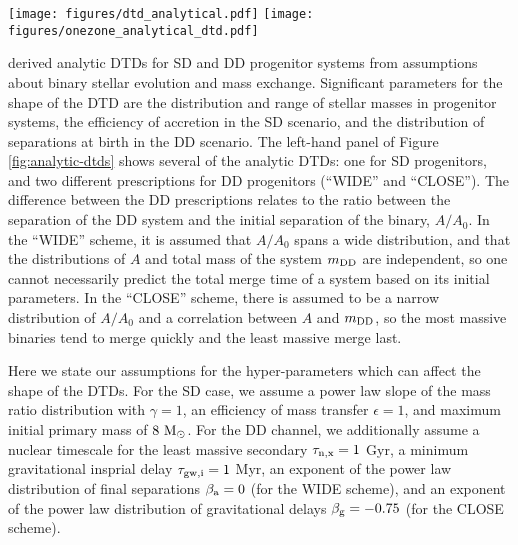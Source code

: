 \documentclass[twocolumn,twocolappendix]{aastex631}
\begin{document}
\begin{figure*}
    \centering
    \texttt{[image: figures/dtd\_analytical.pdf]}
    \texttt{[image: figures/onezone\_analytical\_dtd.pdf]}
    \caption{\textit{Left:} Analytic DTDs from \citet[][solid curves]{Greggio2005-AnalyticalRates} and simplified approximations thereof (dashed curves; see Section \ref{sec:dtd-models}). Some functions are presented with a constant multiplicative factor for visual clarity. \textit{Right:} Abundance tracks and distributions from one-zone models with the analytic and simple DTDs (same color scheme). For visual clarity, we vary the mass-loading factor to be $\eta=4$, $\eta=2$, and $\eta=1$ for the red, green, and blue curves, respectively. All other model parameters are identical.}
    \label{fig:analytic-dtds}
\end{figure*}

\citet{Greggio2005-AnalyticalRates} derived analytic DTDs for SD and DD progenitor systems from assumptions about binary stellar evolution and mass exchange. Significant parameters for the shape of the DTD are the distribution and range of stellar masses in progenitor systems, the efficiency of accretion in the SD scenario, and the distribution of separations at birth in the DD scenario. The left-hand panel of Figure \ref{fig:analytic-dtds} shows several of the \citet{Greggio2005-AnalyticalRates} analytic DTDs: one for SD progenitors, and two different prescriptions for DD progenitors (``WIDE'' and ``CLOSE''). The difference between the DD prescriptions relates to the ratio between the separation of the DD system and the initial separation of the binary, $A/A_0$. In the ``WIDE'' scheme, it is assumed that $A/A_0$ spans a wide distribution, and that the distributions of $A$ and total mass of the system $m_{\rm DD}$ are independent, so one cannot necessarily predict the total merge time of a system based on its initial parameters. In the ``CLOSE'' scheme, there is assumed to be a narrow distribution of $A/A_0$ and a correlation between $A$ and $m_{\rm DD}$, so the most massive binaries tend to merge quickly and the least massive merge last.

Here we state our assumptions for the hyper-parameters which can affect the shape of the \citet{Greggio2005-AnalyticalRates} DTDs. For the SD case, we assume a power law slope of the mass ratio distribution with $\gamma=1$, an efficiency of mass transfer $\epsilon=1$, and maximum initial primary mass of $8~{\rm M}_\odot$. For the DD channel, we additionally assume a nuclear timescale for the least massive secondary $\tau_{\rm n,x}=1$ Gyr, a minimum gravitational insprial delay $\tau_{\rm gw,i}=1$ Myr, an exponent of the power law distribution of final separations $\beta_{\rm a}=0$ (for the WIDE scheme), and an exponent of the power law distribution of gravitational delays $\beta_{\rm g}=-0.75$ (for the CLOSE scheme).
\end{document}
